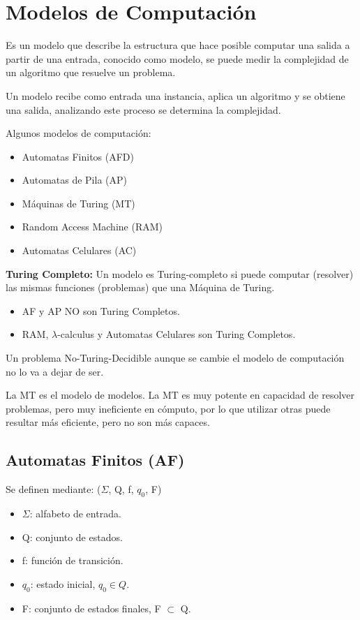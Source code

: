 \chapter{Modelos de Computación}\label{ch:modelos-de-computación}
Es un modelo que describe la estructura que hace posible computar una salida a partir de una entrada, conocido como modelo, se puede medir la complejidad de un algoritmo que resuelve un problema.

Un modelo recibe como entrada una instancia, aplica un algoritmo y se obtiene una salida, analizando este proceso se determina la complejidad.

Algunos modelos de computación:
\begin{itemize}
	\item Automatas Finitos (AFD)
	\item Automatas de Pila (AP)
	\item Máquinas de Turing (MT)
	\item Random Access Machine (RAM)
	\item Automatas Celulares (AC)
\end{itemize}

\textbf{Turing Completo:} Un modelo es Turing-completo si puede computar (resolver) las mismas funciones (problemas) que una Máquina de Turing.
\begin{itemize}
	\item AF y AP NO son Turing Completos.
	\item RAM, $\lambda$-calculus y Automatas Celulares son Turing Completos.
\end{itemize}

Un problema No-Turing-Decidible aunque se cambie el modelo de computación no lo va a dejar de ser.

La MT es el modelo de modelos. La MT es muy potente en capacidad de resolver problemas, pero muy ineficiente en cómputo, por lo que utilizar otras puede resultar más eficiente, pero no son más capaces.

\section{Automatas Finitos (AF)}
Se definen mediante: ($\Sigma$, Q, f, $q_0$, F)
\begin{itemize}
	\item $\Sigma$: alfabeto de entrada.
	\item Q: conjunto de estados.
	\item f: función de transición.
	\item $q_0$: estado inicial, $q_0 \in Q$.
	\item F: conjunto de estados finales, F $\subset$ Q.
\end{itemize}

